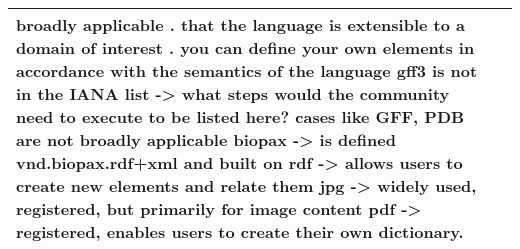 \documentclass[english]{article}
\begin{document}
\begin{longtable}{|p{5cm}|p{9cm}|}
broadly applicable\newline 
. that the language is extensible to a domain of interest\newline 
. you can define your own elements in accordance with the semantics of the language\newline 
\newline 
gff3 is not in the IANA list -> what steps would the community need to execute to be listed here?
cases like GFF, PDB are not broadly applicable \newline 
biopax -> is defined vnd.biopax.rdf+xml and built on rdf -> allows users to create new elements and relate them \newline 
jpg -> widely used, registered, but primarily for image content\newline 
pdf -> registered, enables users to create their own dictionary.\newline 
 

\\
\hline

\end{longtable}



\newpage
\end{document}
